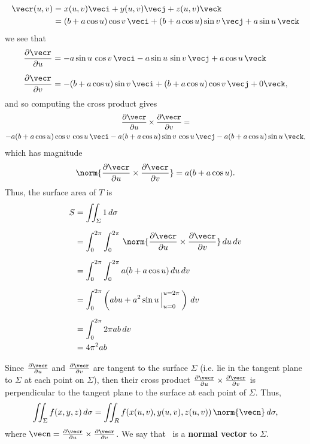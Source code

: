 {\begin{align*}
 \vecr(u,v) &= x(u,v) \veci + y(u,v) \vecj + z(u,v) \veck\\
 &= (b+a\cos u)\cos v \,\veci + (b+a\cos u)\sin v \,\vecj + a\sin u \,\veck
\end{align*}
we see that
\begin{align*}
 \frac{\partial \vecr}{\partial u} &=
  -a\sin u\,\cos v \,\veci - a\sin u\,\sin v \,\vecj + a\cos u \,\veck\\[6pt]
 \frac{\partial \vecr}{\partial v} &=
  -(b+a\cos u)\sin v \,\veci + (b+a\cos u)\cos v \,\vecj + 0 \veck ,
\end{align*}
and so computing the cross product gives
\begin{multline*}
 \frac{\partial \vecr}{\partial u}\times\frac{\partial \vecr}{\partial v} =\\
  - a(b+a\cos u)\cos v\,\cos u \,\veci
  - a(b+a\cos u)\sin v\,\cos u\,\vecj
  - a(b+a\cos u)\sin u \,\veck ,
\end{multline*}
which has magnitude
\[
 \norm{\frac{\partial \vecr}{\partial u}\times\frac{\partial \vecr}{\partial v}} = a(b+a\cos u) .
\]
Thus, the surface area of $T$ is
\begin{align*}
 S &= \iint_{\Sigma} 1\,d\sigma\\[6pt]
  &= \int_0^{2\pi} \int_0^{2\pi}\,
  \norm{\frac{\partial \vecr}{\partial u}\times\frac{\partial\vecr}{\partial v}}
  \,du\,dv\\[6pt]
  &= \int_0^{2\pi} \int_0^{2\pi} a(b+a\cos u)\,du\,dv\\[6pt]
  &= \int_0^{2\pi} \left( abu + a^2 \sin u \,\Big|_{u=0}^{u=2\pi}\,\right)\,dv\\[6pt]
  &= \int_0^{2\pi} 2\pi ab\,dv\\
  &= 4\pi^2 ab
\end{align*}}

Since $\frac{\partial \vecr}{\partial u}$ and $\frac{\partial \vecr}{\partial v}$ are tangent to the surface $\Sigma$ (i.e. lie in the tangent plane to $\Sigma$ at each point on $\Sigma$), then their cross product $\frac{\partial \vecr}{\partial u}\times\frac{\partial \vecr}{\partial v}$ is perpendicular to the tangent plane to the surface at each point of $\Sigma$. Thus,
\[
 \iint_{\Sigma} f(x,y,z)\,d\sigma = \iint_{R} f(x(u,v),y(u,v),z(u,v))\,\norm{\vecn}\,d\sigma ,
\]
where $\vecn = \frac{\partial \vecr}{\partial u}\times\frac{\partial \vecr}{\partial v}$. We say that \vecn\ is a \textbf{normal vector} to $\Sigma$.

